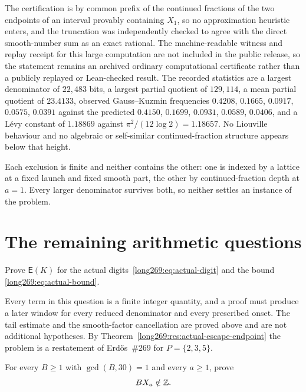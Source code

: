 \documentclass[11pt]{article}
\newcommand{\Esc}{\mathsf E}
\begin{document}
The certification is by common prefix of the continued fractions of the two
endpoints of an interval provably containing $X_1$, so no approximation
heuristic enters, and the truncation was independently checked to agree with
the direct smooth-number sum as an exact rational. The machine-readable witness and replay receipt for this large computation are not included in the public release, so the statement remains an archived ordinary computational certificate rather than a publicly replayed or Lean-checked result.  The recorded statistics are
a largest denominator of $22{,}483$ bits, a largest partial quotient of
$129{,}114$, a mean partial quotient of $23.4133$, observed Gauss--Kuzmin
frequencies $0.4208$, $0.1665$, $0.0917$, $0.0575$, $0.0391$ against the
predicted $0.4150$, $0.1699$, $0.0931$, $0.0589$, $0.0406$, and a L\'evy
constant of $1.18869$ against $\pi^{2}/(12\log2)=1.18657$.  No Liouville
behaviour and no algebraic or self-similar continued-fraction structure appears
below that height.

Each exclusion is finite and neither contains the other: one is indexed by a
lattice at a fixed launch and fixed smooth part, the other by continued-fraction
depth at $a=1$.  Every larger denominator survives both, so neither settles an
instance of the problem.

\section{The remaining arithmetic questions}\label{long269:sec:open}

\begin{problem}\label{long269:prob:producer}
Prove $\Esc(K)$ for the actual digits~\eqref{long269:eq:actual-digit} and the bound
\eqref{long269:eq:actual-bound}.
\end{problem}

Every term in this question is a finite integer quantity, and a proof must
produce a later window for every reduced denominator and every prescribed
onset.  The tail estimate and the smooth-factor cancellation are proved above
and are not additional hypotheses.  By
Theorem~\ref{long269:res:actual-escape-endpoint} the problem is a restatement of
Erd\H{o}s~\#269 for $P=\{2,3,5\}$.

\begin{problem}\label{long269:prob:tails269}
For every $B\ge1$ with $\gcd(B,30)=1$ and every $a\ge1$, prove
\begin{equation}\label{long269:eq:tail-nonintegrality}
 BX_a\notin\mathbb{Z} .
\end{equation}
\end{problem}
\end{document}

